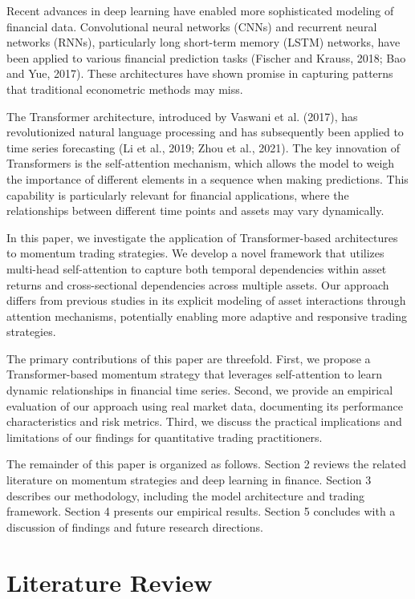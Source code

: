 \documentclass[preprint,authoryear,12pt]{elsarticle}
\begin{document}
Recent advances in deep learning have enabled more sophisticated modeling of financial data. Convolutional neural networks (CNNs) and recurrent neural networks (RNNs), particularly long short-term memory (LSTM) networks, have been applied to various financial prediction tasks (Fischer and Krauss, 2018; Bao and Yue, 2017). These architectures have shown promise in capturing patterns that traditional econometric methods may miss.

The Transformer architecture, introduced by Vaswani et al. (2017), has revolutionized natural language processing and has subsequently been applied to time series forecasting (Li et al., 2019; Zhou et al., 2021). The key innovation of Transformers is the self-attention mechanism, which allows the model to weigh the importance of different elements in a sequence when making predictions. This capability is particularly relevant for financial applications, where the relationships between different time points and assets may vary dynamically.

In this paper, we investigate the application of Transformer-based architectures to momentum trading strategies. We develop a novel framework that utilizes multi-head self-attention to capture both temporal dependencies within asset returns and cross-sectional dependencies across multiple assets. Our approach differs from previous studies in its explicit modeling of asset interactions through attention mechanisms, potentially enabling more adaptive and responsive trading strategies.

The primary contributions of this paper are threefold. First, we propose a Transformer-based momentum strategy that leverages self-attention to learn dynamic relationships in financial time series. Second, we provide an empirical evaluation of our approach using real market data, documenting its performance characteristics and risk metrics. Third, we discuss the practical implications and limitations of our findings for quantitative trading practitioners.

The remainder of this paper is organized as follows. Section 2 reviews the related literature on momentum strategies and deep learning in finance. Section 3 describes our methodology, including the model architecture and trading framework. Section 4 presents our empirical results. Section 5 concludes with a discussion of findings and future research directions.

\section{Literature Review}
\end{document}
